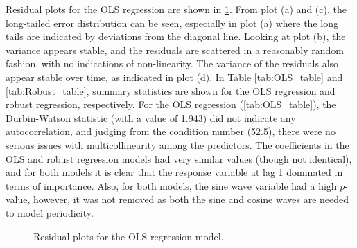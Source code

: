 \label{chapt:appendix_B}
Residual plots for the OLS regression are shown in \cref{fig:residuals_MLR}. From plot (a) and (c), the long-tailed error distribution can be seen, especially in plot (a) where the long tails are indicated by deviations from the diagonal line. Looking at plot (b), the variance appears stable, and the residuals are scattered in a reasonably random fashion, with no indications of non-linearity. The variance of the residuals also appear stable over time, as indicated in plot (d). 
In Table \ref{tab:OLS_table} and \ref{tab:Robust_table}, summary statistics are shown for the OLS regression and robust regression, respectively. For the OLS regression (\cref{tab:OLS_table}), the Durbin-Watson statistic (with a value of 1.943) did not indicate any autocorrelation, and judging from the condition number (52.5), there were no serious issues with multicollinearity among the predictors. The coefficients in the OLS and robust regression models had very similar values (though not identical), and for both models it is clear that the response variable at lag 1 dominated in terms of importance. Also, for both models, the sine wave variable had a high $p$-value, however, it was not removed as both the sine and cosine waves are needed to model periodicity.   

\begin{figure}[h]
\centering
{}
\caption{Residual plots for the OLS regression model.}
\label{fig:residuals_MLR}
\end{figure}

